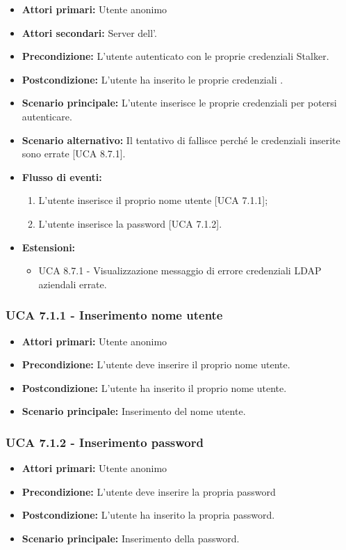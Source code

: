 \begin{itemize}
	\item \textbf{Attori primari:} Utente anonimo 
	\item \textbf{Attori secondari:} Server  dell'.
	\item \textbf{Precondizione:} L'utente  autenticato con le proprie credenziali Stalker.
	\item \textbf{Postcondizione:} L'utente ha inserito le proprie credenziali .
	\item \textbf{Scenario principale:} L'utente inserisce le proprie credenziali  per potersi autenticare.
	\item \textbf{Scenario alternativo:} Il tentativo di  fallisce perché le credenziali inserite sono errate [UCA 8.7.1].
	\item \textbf{Flusso di eventi:}
	\begin{enumerate}
		\item L'utente inserisce il proprio nome utente [UCA 7.1.1];
		\item L'utente inserisce la password [UCA 7.1.2].
	\end{enumerate}
	\item \textbf{Estensioni:}
	\begin{itemize}
		\item UCA 8.7.1 - Visualizzazione messaggio di errore credenziali LDAP aziendali errate.
	\end{itemize}
\end{itemize}

\subsubsection{UCA 7.1.1 - Inserimento nome utente}%
\begin{itemize}
	\item \textbf{Attori primari:} Utente anonimo
	\item \textbf{Precondizione:} L'utente deve inserire il proprio nome utente.
	\item \textbf{Postcondizione:} L'utente ha inserito il proprio nome utente.
	\item \textbf{Scenario principale:} Inserimento del nome utente.
\end{itemize}

\subsubsection{UCA 7.1.2 - Inserimento password}%
\begin{itemize}
	\item \textbf{Attori primari:} Utente anonimo
	\item \textbf{Precondizione:} L'utente deve inserire la propria password
	\item \textbf{Postcondizione:} L'utente ha inserito la propria password.
	\item \textbf{Scenario principale:} Inserimento della password.
\end{itemize}
